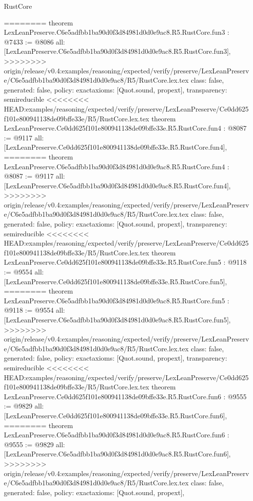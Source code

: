 \begin{lexlean}{RustCore}
\begin{coremodule}
{\begin{coremodule}
{{{{{{========
theorem LexLeanPreserve.C6e5adfbb1ba90d0f3d84981d0d0e9ac8.R5.RustCore.fun3 : @7433 := @8086 {
  all: [LexLeanPreserve.C6e5adfbb1ba90d0f3d84981d0d0e9ac8.R5.RustCore.fun3],
>>>>>>>> origin/release/v0.4:examples/reasoning/expected/verify/preserve/LexLeanPreserve/C6e5adfbb1ba90d0f3d84981d0d0e9ac8/R5/RustCore.lex.tex
  class: false,
  generated: false,
  policy: exact{axioms: [Quot.sound, propext]},
  transparency: semireducible
}
<<<<<<<< HEAD:examples/reasoning/expected/verify/preserve/LexLeanPreserve/Ce0dd625f101e800941138de09bffe33e/R5/RustCore.lex.tex
theorem LexLeanPreserve.Ce0dd625f101e800941138de09bffe33e.R5.RustCore.fun4 : @8087 := @9117 {
  all: [LexLeanPreserve.Ce0dd625f101e800941138de09bffe33e.R5.RustCore.fun4],
========
theorem LexLeanPreserve.C6e5adfbb1ba90d0f3d84981d0d0e9ac8.R5.RustCore.fun4 : @8087 := @9117 {
  all: [LexLeanPreserve.C6e5adfbb1ba90d0f3d84981d0d0e9ac8.R5.RustCore.fun4],
>>>>>>>> origin/release/v0.4:examples/reasoning/expected/verify/preserve/LexLeanPreserve/C6e5adfbb1ba90d0f3d84981d0d0e9ac8/R5/RustCore.lex.tex
  class: false,
  generated: false,
  policy: exact{axioms: [Quot.sound, propext]},
  transparency: semireducible
}
<<<<<<<< HEAD:examples/reasoning/expected/verify/preserve/LexLeanPreserve/Ce0dd625f101e800941138de09bffe33e/R5/RustCore.lex.tex
theorem LexLeanPreserve.Ce0dd625f101e800941138de09bffe33e.R5.RustCore.fun5 : @9118 := @9554 {
  all: [LexLeanPreserve.Ce0dd625f101e800941138de09bffe33e.R5.RustCore.fun5],
========
theorem LexLeanPreserve.C6e5adfbb1ba90d0f3d84981d0d0e9ac8.R5.RustCore.fun5 : @9118 := @9554 {
  all: [LexLeanPreserve.C6e5adfbb1ba90d0f3d84981d0d0e9ac8.R5.RustCore.fun5],
>>>>>>>> origin/release/v0.4:examples/reasoning/expected/verify/preserve/LexLeanPreserve/C6e5adfbb1ba90d0f3d84981d0d0e9ac8/R5/RustCore.lex.tex
  class: false,
  generated: false,
  policy: exact{axioms: [Quot.sound, propext]},
  transparency: semireducible
}
<<<<<<<< HEAD:examples/reasoning/expected/verify/preserve/LexLeanPreserve/Ce0dd625f101e800941138de09bffe33e/R5/RustCore.lex.tex
theorem LexLeanPreserve.Ce0dd625f101e800941138de09bffe33e.R5.RustCore.fun6 : @9555 := @9829 {
  all: [LexLeanPreserve.Ce0dd625f101e800941138de09bffe33e.R5.RustCore.fun6],
========
theorem LexLeanPreserve.C6e5adfbb1ba90d0f3d84981d0d0e9ac8.R5.RustCore.fun6 : @9555 := @9829 {
  all: [LexLeanPreserve.C6e5adfbb1ba90d0f3d84981d0d0e9ac8.R5.RustCore.fun6],
>>>>>>>> origin/release/v0.4:examples/reasoning/expected/verify/preserve/LexLeanPreserve/C6e5adfbb1ba90d0f3d84981d0d0e9ac8/R5/RustCore.lex.tex
  class: false,
  generated: false,
  policy: exact{axioms: [Quot.sound, propext]},
}}}}}}}}}}
\end{coremodule}}
\end{coremodule}
\end{lexlean}
